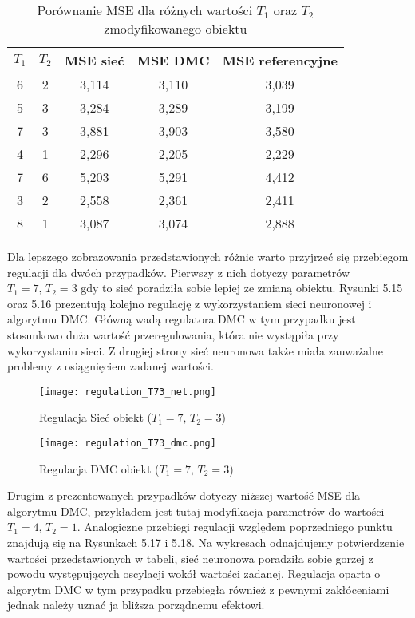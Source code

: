 \begin{table}[!h] \label{tab:tabela4} \centering
\caption{Porównanie MSE dla różnych wartości \(T_1\) oraz \(T_2\) zmodyfikowanego obiektu}
\begin{tabular} {| c | c | c | c | c |} \hline
    \(T_1\) & \(T_2\) & MSE sieć & MSE DMC & MSE referencyjne  \\ \hline\hline
    6 & 2 & 3,114 & 3,110 & 3,039 \\ \hline
    5 & 3 & 3,284 & 3,289 & 3,199 \\ \hline
    7 & 3 & 3,881 & 3,903 & 3,580 \\ \hline
    4 & 1 & 2,296 & 2,205 & 2,229 \\ \hline
    7 & 6 & 5,203 & 5,291 & 4,412 \\ \hline
    3 & 2 & 2,558 & 2,361 & 2,411 \\ \hline
    8 & 1 & 3,087 & 3,074 & 2,888 \\ \hline
\end{tabular}
\end{table}

\par Dla lepszego zobrazowania przedstawionych różnic warto przyjrzeć się przebiegom regulacji dla dwóch przypadków. Pierwszy z nich dotyczy parametrów \( T_1=7, \, T_2=3 \) gdy to sieć poradziła sobie lepiej ze zmianą obiektu. Rysunki 5.15 oraz 5.16 prezentują kolejno regulację z wykorzystaniem sieci neuronowej i algorytmu DMC. Główną wadą regulatora DMC w tym przypadku jest stosunkowo duża wartość przeregulowania, która nie wystąpiła przy wykorzystaniu sieci. Z drugiej strony sieć neuronowa także miała zauważalne problemy z osiągnięciem zadanej wartości.

\begin{figure}[!h]
\centering
\begin{minipage}{.5\textwidth}
  \label{fig:Regulation-T73-net}
  \centering \texttt{[image: regulation\_T73\_net.png]}
  \caption{Regulacja Sieć obiekt (\( T_1=7, \, T_2=3 \))}
  \label{fig:test1}
\end{minipage}%
\begin{minipage}{.5\textwidth}
  \label{fig:Regulation-T73-dmc}
  \centering \texttt{[image: regulation\_T73\_dmc.png]}
  \caption{Regulacja DMC obiekt (\( T_1=7, \, T_2=3 \))}
\end{minipage}
\end{figure}

\par Drugim z prezentowanych przypadków dotyczy niższej wartość MSE dla algorytmu DMC, przykładem jest tutaj modyfikacja parametrów do wartości \( T_1=4, \, T_2=1 \). Analogiczne przebiegi regulacji względem poprzedniego punktu znajdują się na Rysunkach 5.17 i 5.18. Na wykresach odnajdujemy potwierdzenie wartości przedstawionych w tabeli, sieć neuronowa poradziła sobie gorzej z powodu występujących oscylacji wokół wartości zadanej. Regulacja oparta o algorytm DMC w tym przypadku przebiegła również z pewnymi zakłóceniami jednak należy uznać ja bliższa porządnemu efektowi. 


